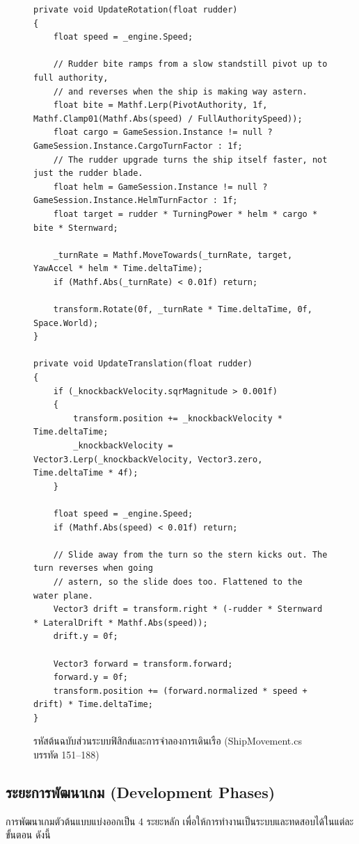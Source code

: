 \begin{figure}[!htbp]
\centering
\begin{lstlisting}[language={[Sharp]C},basicstyle=\ttfamily\footnotesize,firstnumber=151]
private void UpdateRotation(float rudder)
{
    float speed = _engine.Speed;

    // Rudder bite ramps from a slow standstill pivot up to full authority,
    // and reverses when the ship is making way astern.
    float bite = Mathf.Lerp(PivotAuthority, 1f, Mathf.Clamp01(Mathf.Abs(speed) / FullAuthoritySpeed));
    float cargo = GameSession.Instance != null ? GameSession.Instance.CargoTurnFactor : 1f;
    // The rudder upgrade turns the ship itself faster, not just the rudder blade.
    float helm = GameSession.Instance != null ? GameSession.Instance.HelmTurnFactor : 1f;
    float target = rudder * TurningPower * helm * cargo * bite * Sternward;

    _turnRate = Mathf.MoveTowards(_turnRate, target, YawAccel * helm * Time.deltaTime);
    if (Mathf.Abs(_turnRate) < 0.01f) return;

    transform.Rotate(0f, _turnRate * Time.deltaTime, 0f, Space.World);
}

private void UpdateTranslation(float rudder)
{
    if (_knockbackVelocity.sqrMagnitude > 0.001f)
    {
        transform.position += _knockbackVelocity * Time.deltaTime;
        _knockbackVelocity = Vector3.Lerp(_knockbackVelocity, Vector3.zero, Time.deltaTime * 4f);
    }

    float speed = _engine.Speed;
    if (Mathf.Abs(speed) < 0.01f) return;

    // Slide away from the turn so the stern kicks out. The turn reverses when going
    // astern, so the slide does too. Flattened to the water plane.
    Vector3 drift = transform.right * (-rudder * Sternward * LateralDrift * Mathf.Abs(speed));
    drift.y = 0f;

    Vector3 forward = transform.forward;
    forward.y = 0f;
    transform.position += (forward.normalized * speed + drift) * Time.deltaTime;
}
\end{lstlisting}
\caption{รหัสต้นฉบับส่วนระบบฟิสิกส์และการจำลองการเดินเรือ (ShipMovement.cs บรรทัด 151--188)}
\label{fig:code_physics}
\end{figure}

\subsection{ระยะการพัฒนาเกม (Development Phases)}
การพัฒนาเกมตัวต้นแบบแบ่งออกเป็น 4 ระยะหลัก เพื่อให้การทำงานเป็นระบบและทดสอบได้ในแต่ละขั้นตอน ดังนี้

